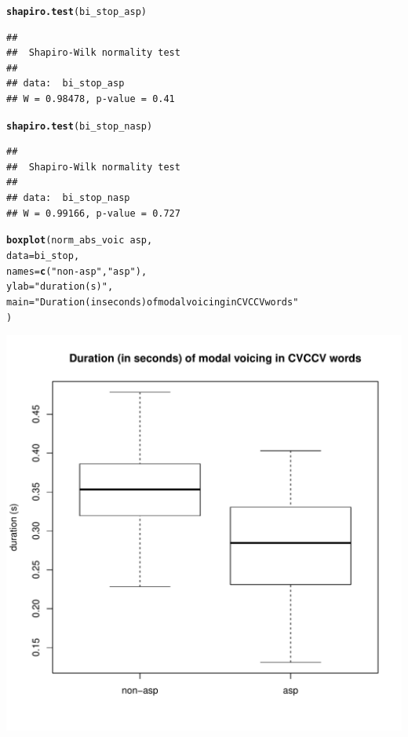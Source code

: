 \documentclass[a4paper,11pt]{article}\usepackage[]{graphicx}\usepackage[]{color}
\makeatletter
\def\maxwidth{ %
  \ifdim\Gin@nat@width>\linewidth
    \linewidth
  \else
    \Gin@nat@width
  \fi
}
\newcommand{\hlstr}[1]{\textcolor[rgb]{0.192,0.494,0.8}{#1}}%
\newcommand{\hlopt}[1]{\textcolor[rgb]{0,0,0}{#1}}%
\newcommand{\hlstd}[1]{\textcolor[rgb]{0.345,0.345,0.345}{#1}}%
\newcommand{\hlkwc}[1]{\textcolor[rgb]{0.333,0.667,0.333}{#1}}%
\newcommand{\hlkwd}[1]{\textcolor[rgb]{0.737,0.353,0.396}{\textbf{#1}}}%
\newenvironment{kframe}{%
 \def\at@end@of@kframe{}%
 \ifinner\ifhmode%
  \def\at@end@of@kframe{\end{minipage}}%
  \begin{minipage}{\columnwidth}%
 \fi\fi%
 \def\FrameCommand##1{\hskip\@totalleftmargin \hskip-\fboxsep
 \colorbox{shadecolor}{##1}\hskip-\fboxsep
     \hskip-\linewidth \hskip-\@totalleftmargin \hskip\columnwidth}%
 \MakeFramed {\advance\hsize-\width
   \@totalleftmargin\z@ \linewidth\hsize
   \@setminipage}}%
 {\par\unskip\endMakeFramed%
 \at@end@of@kframe}
\newenvironment{knitrout}{}{} %
\makeatother
\begin{document}
\begin{knitrout}
\end{knitrout}

\begin{knitrout}
\color{fgcolor}\begin{kframe}
\begin{alltt}
\hlkwd{shapiro.test}\hlstd{(bi_stop_asp)}
\end{alltt}
\begin{verbatim}
## 
## 	Shapiro-Wilk normality test
## 
## data:  bi_stop_asp
## W = 0.98478, p-value = 0.41
\end{verbatim}
\begin{alltt}
\hlkwd{shapiro.test}\hlstd{(bi_stop_nasp)}
\end{alltt}
\begin{verbatim}
## 
## 	Shapiro-Wilk normality test
## 
## data:  bi_stop_nasp
## W = 0.99166, p-value = 0.727
\end{verbatim}
\end{kframe}
\end{knitrout}

\begin{knitrout}
\color{fgcolor}\begin{kframe}
\begin{alltt}
\hlkwd{boxplot}\hlstd{(norm_abs_voic} \hlopt{~} \hlstd{asp,}
        \hlkwc{data} \hlstd{= bi_stop,}
        \hlkwc{names} \hlstd{=} \hlkwd{c}\hlstd{(}\hlstr{"non-asp"}\hlstd{,} \hlstr{"asp"}\hlstd{),}
        \hlkwc{ylab} \hlstd{=} \hlstr{"duration (s)"}\hlstd{,}
        \hlkwc{main} \hlstd{=} \hlstr{"Duration (in seconds) of modal voicing in CVCCV words"}
        \hlstd{)}
\end{alltt}
\end{kframe}
\includegraphics[width=\maxwidth]{img/bi-stop-box-1} 

\end{knitrout}
\end{document}
